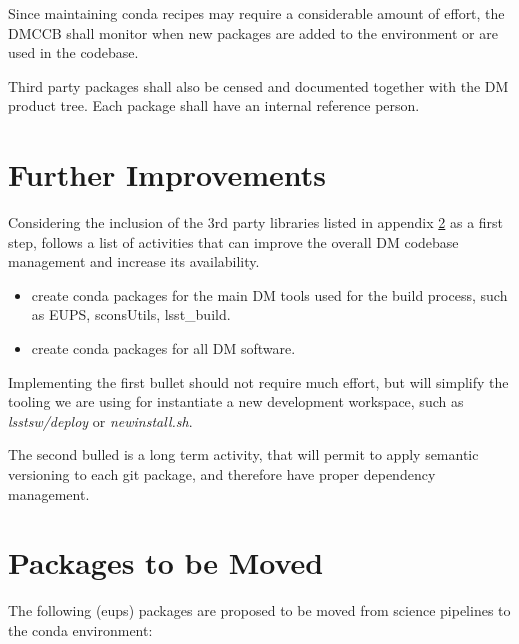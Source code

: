 Since maintaining conda recipes may require a considerable amount of effort, the DMCCB shall monitor when new packages are added to the environment or are used in the codebase.

Third party packages shall also be censed and documented together with the DM product tree. 
Each package shall have an internal reference person.


\newpage
\section{Further Improvements}

Considering the inclusion of the 3rd party libraries listed in appendix \ref{sec:tomove} as a first step, follows a list of activities that can improve the overall DM codebase management and increase its availability.

\begin{itemize}
\item create conda packages for the main DM tools used for the build process, such as EUPS, sconsUtils, lsst\_build. 
\item create conda packages for all DM software.
\end{itemize}

Implementing the first bullet should not require much effort, but will simplify the tooling we are using for instantiate a new development workspace, such as \textit{lsstsw/deploy} or \textit{newinstall.sh}.

The second bulled is a long term activity, that will permit to apply semantic versioning to each git package, and therefore have proper dependency management.


\newpage
\appendix
\section{Packages to be Moved} \label{sec:tomove}

The following (eups) packages are proposed to be moved from science pipelines to the conda environment:

